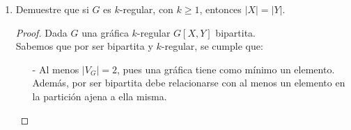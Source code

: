 \documentclass{article}
\begin{document}
\begin{enumerate}
\begin{enumerate}
\begin{proof}
\begin{itemize}
          \item Hip\'otesis de Inducci\'on: ($n=k$)

            Supongamos que $G[X, Y_k]$ es una gr\'afica
            bipartita y $\sum_{v \in X}d(v) = \sum_{v \in Y_k}d(v)$. \\

          \item PASO INDUCTIVO: $(n=k+1)$

            Sea $G[X,Y_{k+1}]$ funci\'on bipartita. \\
            Demostraremos que $\sum_{v \in X} d(v) = \sum_{v \in Y_{k+1}}d(v)$.

            Por hip\'otesis de inducci\'on, tenemos que $\sum_{v \in X}d(v) = \sum_{v \in Y_k}d(v)$. Luego, si agregamos un v\'ertice a Y$_k$, tenemos que $|Y_k|+1 = |Y_{k+1}|$. \\
            Por defici\'on de gr\'afica bipartita, existir\'an v\'ertices de $X$ que son adyacentes
            con el nuevo v\'ertice en $Y$. \\
            Sea $q$ el número de nuevas relaciones entre $X$ y el nuevo v\'ertice en $Y$. \\
            Vemos que el grado del nuevo v\'ertice en $Y$ es igual a $q$. \\
            Entonces:
            $$\sum_{v \in X} d(v) = \sum_{v \in Y_k}d(v) + q =  \sum_{v \in Y_{k+1}}d(v)$$
        \end{itemize}

        Por lo tanto, para toda $G$ tenemos que $\sum_{v \in X}d(v) = \sum_{v \in Y}d(v)$.
        \end{proof}

      \item Demuestre que si $G$ es $k$-regular, con $k \ge 1$, entonces
        $|X| = |Y|$.

        \begin{proof}
          Dada $G$ una gr\'afica $k$-regular $G[X,Y]$ bipartita. \\
          Sabemos que por ser bipartita y $k$-regular, se cumple que:

          \begin{itemize}
            \item[-] Al menos $|V_G|=2$, pues una gr\'afica tiene como m\'inimo
            un elemento. Adem\'as, por ser bipartita debe relacionarse con al
            menos un elemento en la partici\'on ajena a ella misma.


\end{itemize}
\end{proof}
\end{enumerate}
\end{enumerate}
\end{document}
